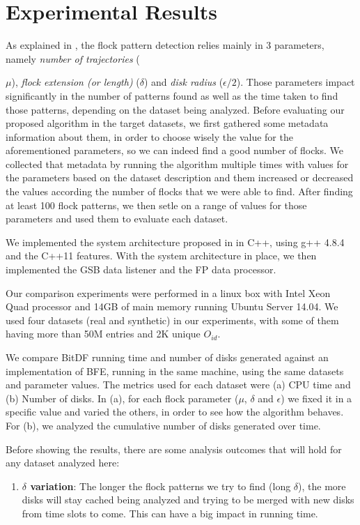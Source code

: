 \chapter{Experimental Results}
\label{chp:results}
As explained in , the flock pattern detection relies mainly in 3 parameters, namely
\textit{number of trajectories} ({$\mu$), \textit{flock extension (or length)} ($\delta$) and \textit{disk radius}
($\epsilon/2$). Those parameters impact significantly in the number of patterns found as well as the time taken to find
those patterns, depending on the dataset being analyzed. Before evaluating our proposed algorithm in the target
datasets, we first gathered some metadata information about them, in order to choose wisely the value for the
aforementioned parameters, so we can indeed find a good number of flocks. We collected that metadata by running the
algorithm multiple times with values for the parameters based on the dataset description and them increased or
decreased the values according the number of flocks that we were able to find. After finding at least 100 flock
patterns, we then setle on a range of values for those parameters and used them to evaluate each dataset.

We implemented the system architecture proposed in  in C++, using g++ 4.8.4 and the C++11
\citep{cpp11spec} features. With the system architecture in place, we then implemented the GSB data listener and the FP
data processor.

Our comparison experiments were performed in a linux box with Intel Xeon Quad processor and 14GB of main memory running
Ubuntu Server 14.04. We used four datasets (real and synthetic) in our experiments, with some of them having more than
50M entries and 2K unique $O_{id}$.

We compare BitDF running time and number of disks generated against an implementation of BFE, running in the same
machine, using the same datasets and parameter values. The metrics used for each dataset were (a) CPU time and (b)
Number of disks. In (a), for each flock parameter ($\mu$, $\delta$ and $\epsilon$) we fixed it in a specific value and
varied the others, in order to see how the algorithm behaves. For (b), we analyzed the cumulative number of disks
generated over time.

Before showing the results, there are some analysis outcomes that will hold for any dataset analyzed here:

\begin{enumerate}
    \item \textbf{$\delta$ variation}: The longer the flock patterns we try to find (long $\delta$), the more disks will
        stay cached being analyzed and trying to be merged with new disks from time slots to come. This can have a big
        impact in running time.\label{sssec:lvariation}


\end{enumerate}}
